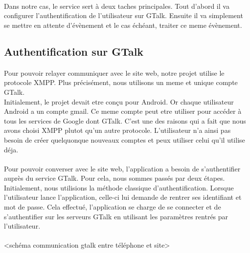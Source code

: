 \paragraph{}
Dans notre cas, le service sert à deux taches principales. Tout d'abord il va configurer l'authentification
de l'utilisateur sur GTalk. Ensuite il va simplement se mettre en attente d'évènement et le cas échéant, 
traiter ce meme évènement.




\subsection{Authentification sur GTalk}


\paragraph{}
Pour pouvoir relayer communiquer avec le site web, notre projet utilise le protocole XMPP. Plus 
précisément, nous utilisons un meme et unique compte GTalk. 
\\
Initialement, le projet devait etre conçu pour Android. Or chaque utilisateur Android a un compte 
gmail. Ce meme compte peut etre utiliser pour accéder à tous les services de Google dont GTalk.
C'est une des raisons qui a fait que nous avons choisi XMPP plutot qu'un autre protocole. L'utilisateur
n'a ainsi pas besoin de créer quelquonque nouveaux comptes et peux utiliser celui qu'il utilise déja.

\paragraph{}
Pour pouvoir converser avec le site web, l'application a besoin de s'authentifier auprès du service
GTalk. Pour cela, nous sommes passés par deux étapes. 
\\
Initialement, nous utilisions la méthode classique d'authentification. Lorsque l'utilisateur lance 
l'application, celle-ci lui demande de rentrer ses identifiant et mot de passe. Cela effectué, 
l'application se charge de se connecter et de s'authentifier sur les serveurs GTalk en utilisant les
paramètres rentrés par l'utilisateur.
\\\\
<schéma communication gtalk entre téléphone et site>
\\\\


